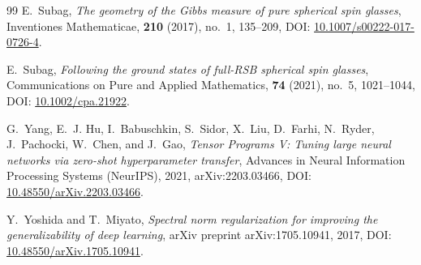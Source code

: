 \documentclass[11pt,a4paper,reqno]{amsart}
\theoremstyle{definition}
\numberwithin{equation}{section}
\begin{document}
\begin{thebibliography}{99}
E.~Subag,
\emph{The geometry of the Gibbs measure of pure spherical spin glasses},
Inventiones Mathematicae, \textbf{210} (2017), no.~1, 135--209, DOI: \href{https://doi.org/10.1007/s00222-017-0726-4}{10.1007/s00222-017-0726-4}.

E.~Subag,
\emph{Following the ground states of full-RSB spherical spin glasses},
Communications on Pure and Applied Mathematics, \textbf{74} (2021), no.~5, 1021--1044, DOI: \href{https://doi.org/10.1002/cpa.21922}{10.1002/cpa.21922}.

G.~Yang, E.~J. Hu, I.~Babuschkin, S.~Sidor, X.~Liu, D.~Farhi, N.~Ryder, J.~Pachocki, W.~Chen, and J.~Gao,
\emph{Tensor Programs V: Tuning large neural networks via zero-shot hyperparameter transfer},
Advances in Neural Information Processing Systems (NeurIPS), 2021, arXiv:2203.03466, DOI: \href{https://doi.org/10.48550/arXiv.2203.03466}{10.48550/arXiv.2203.03466}.

Y.~Yoshida and T.~Miyato,
\emph{Spectral norm regularization for improving the generalizability of deep learning},
arXiv preprint arXiv:1705.10941, 2017, DOI: \href{https://doi.org/10.48550/arXiv.1705.10941}{10.48550/arXiv.1705.10941}.

\end{thebibliography}
\end{document}
